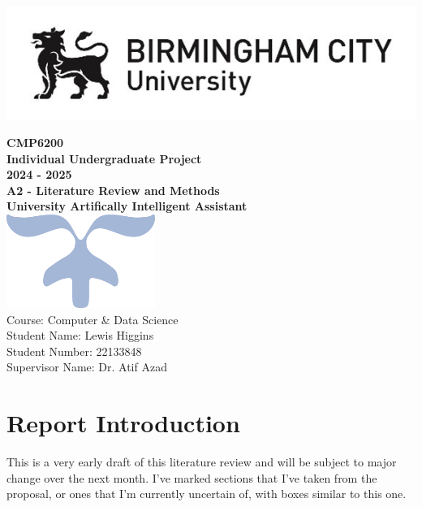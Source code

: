 \documentclass[12pt]{report}
\begin{document}
    \makeatletter
    \begin{titlepage}
        \includegraphics[width=0.3\linewidth]{BCUWide.jpg}\\[4ex]
        \vspace{1cm}
        \begin{center}
            {\huge \bfseries  CMP6200}\\[2ex]
            {\huge \bfseries  Individual Undergraduate Project}\\[2ex]
            {\huge \bfseries 2024 - 2025}\\[6ex]
            {\large \bfseries A2 - Literature Review and Methods}\\[10ex]
            {\huge \bfseries University Artifically Intelligent Assistant}\\[6ex]
            \includegraphics[width=0.1\linewidth]{Symbol.png}\\[40ex]
            Course: Computer \& Data Science\\
            Student Name: Lewis Higgins\\
            Student Number: 22133848\\
            Supervisor Name: Dr. Atif Azad
        \end{center}
    \end{titlepage}
    \makeatother
    \thispagestyle{empty}
    \newpage

    \tableofcontents

    \chapter{Report Introduction}\label{ch:introduction}

    \begin{tcolorbox}[colback=orange!5!white,colframe=orange!75!black,title=Draft notice]
        This is a very early draft of this literature review and will be subject to major change
        over the next month. I've marked sections that I've taken from the proposal, or ones that 
        I'm currently uncertain of, with boxes similar to this one.
    \end{tcolorbox}
\end{document}
